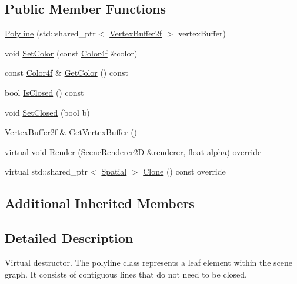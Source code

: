 \subsection*{Public Member Functions}
\begin{DoxyCompactItemize}
\item 
\hyperlink{classastu_1_1suite2d_1_1Polyline_a051bca4fde4c41e93462d229b17fa370}{Polyline} (std\+::shared\+\_\+ptr$<$ \hyperlink{group__gfx__group_ga081cf45a441eef100dfbb1e0f64c3826}{Vertex\+Buffer2f} $>$ vertex\+Buffer)
\item 
void \hyperlink{classastu_1_1suite2d_1_1Polyline_a2fb760ad09c0dbcfc9128a8b04bb312f}{Set\+Color} (const \hyperlink{classastu_1_1Color}{Color4f} \&color)
\item 
const \hyperlink{classastu_1_1Color}{Color4f} \& \hyperlink{classastu_1_1suite2d_1_1Polyline_a6d75bf4ea2c4ff03260f336fe27541a7}{Get\+Color} () const
\item 
bool \hyperlink{classastu_1_1suite2d_1_1Polyline_a3785365e970d6bf6c083730458569e79}{Is\+Closed} () const
\item 
void \hyperlink{classastu_1_1suite2d_1_1Polyline_a92eb9c238bcdcf9c826f609c3ffa357d}{Set\+Closed} (bool b)
\item 
\hyperlink{group__gfx__group_ga081cf45a441eef100dfbb1e0f64c3826}{Vertex\+Buffer2f} \& \hyperlink{classastu_1_1suite2d_1_1Polyline_aeb8d924a70278166a553d099cec2f5fe}{Get\+Vertex\+Buffer} ()
\item 
virtual void \hyperlink{classastu_1_1suite2d_1_1Polyline_ad4aef126b57b93beba4ab03c01403406}{Render} (\hyperlink{classastu_1_1suite2d_1_1SceneRenderer2D}{Scene\+Renderer2D} \&renderer, float \hyperlink{classastu_1_1suite2d_1_1Spatial_a8aedfdadbece638bf283d4ba232c6928}{alpha}) override
\item 
virtual std\+::shared\+\_\+ptr$<$ \hyperlink{classastu_1_1suite2d_1_1Spatial}{Spatial} $>$ \hyperlink{classastu_1_1suite2d_1_1Polyline_acdced9a02e4f789ff04feca46bdb297c}{Clone} () const override
\end{DoxyCompactItemize}
\subsection*{Additional Inherited Members}


\subsection{Detailed Description}
Virtual destructor. The polyline class represents a leaf element within the scene graph. It consists of contiguous lines that do not need to be closed. 

